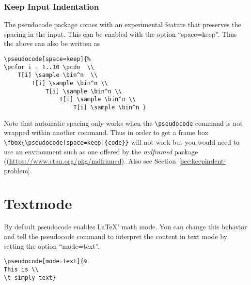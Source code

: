 \documentclass[a4paper]{report}
\begin{document}
\subsubsection{Keep Input Indentation}
\label{sec:keepindent}
The pseudocode package comes with an experimental feature that preserves the spacing in the input. This can be enabled with
the option \enquote{space=keep}. Thus the above can also be written as
\begin{center}
\end{center}
\begin{lstlisting}
\pseudocode[space=keep]{%
\pcfor i = 1..10 \pcdo  \\
    T[i] \sample \bin^n  \\
        T[i] \sample \bin^n \\
            T[i] \sample \bin^n \\
                T[i] \sample \bin^n \\
                    T[i] \sample \bin^n }
\end{lstlisting}
Note that automatic spacing only works when the \lstinline$\pseudocode$ command is not wrapped within another command.
Thus in order to get a frame box \lstinline$\fbox{\pseudocode[space=keep]{code}}$ will not work but you would need to use
an environment such as one offered by the \emph{mdframed} package ((\url{https://www.ctan.org/pkg/mdframed}). Also see
Section~\ref{sec:keepindent-problem}.

 
\section{Textmode}

By default pseudocode enables \LaTeX' math mode. You can change this behavior and tell the pseudocode command to interpret the content
in text mode by setting the option \enquote{mode=text}.
\begin{center}
\end{center}
\begin{lstlisting}
\pseudocode[mode=text]{%
This is \\
\t simply text}
\end{lstlisting}
\end{document}
